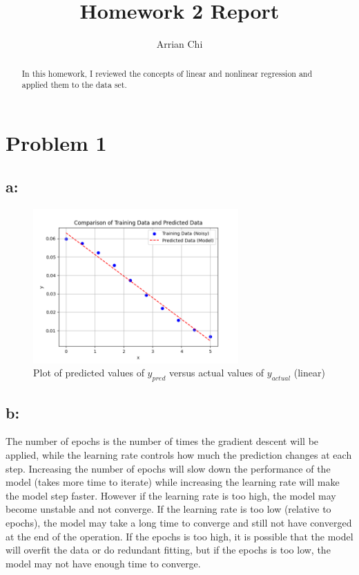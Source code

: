 \documentclass[letterpaper, 10 pt, conference]{ieeeconf}  %
\title{\LARGE \bf
Homework 2 Report
}
\author{Arrian Chi%
}
\begin{document}
\onecolumn


\maketitle
\thispagestyle{empty}
\pagestyle{empty}



\begin{abstract}

In this homework, I reviewed the concepts of linear and nonlinear regression and applied them to the data set. 

\end{abstract}

\section*{Problem 1}
\subsection*{a:}
\begin{figure}[!ht]
        \centering
        \includegraphics[width=0.7\textwidth,keepaspectratio]{linear_fit.png}
        \caption{Plot of predicted values of $y_{pred}$ versus actual values of $y_{actual}$ (linear)}
        \label{fig:linear_fit}
\end{figure}
\subsection*{b:}
The number of epochs is the number of times the gradient descent will be applied, while the learning rate controls how much the prediction changes at each step. Increasing the number of epochs will slow down the performance of the model (takes more time to iterate) while increasing the learning rate will make the model step faster. However if the learning rate is too high, the model may become unstable and not converge. If the learning rate is too low (relative to epochs), the model may take a long time to converge and still not have converged at the end of the operation. If the epochs is too high, it is possible that the model will overfit the data or do redundant fitting, but if the epochs is too low, the model may not have enough time to converge.
\end{document}
